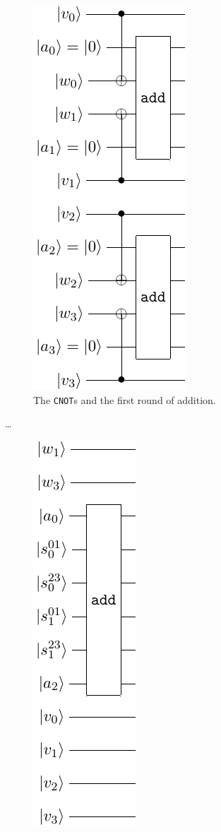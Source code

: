 \documentclass[notitlepage]{article}
\theoremstyle{definition}
\begin{document}
\begin{figure}
    \begin{subfigure}{.3\textwidth}
        \centering
        \includegraphics{popcnt_sieve_pt1}
        \caption{The \texttt{CNOT}s and the first round of addition.}\label{subfig:naive_popcnt1}
    \end{subfigure}
    \dots
    \begin{subfigure}{.3\textwidth}
        \centering
        \includegraphics{popcnt_sieve_pt2}

\end{subfigure}
\end{figure}
\end{document}
